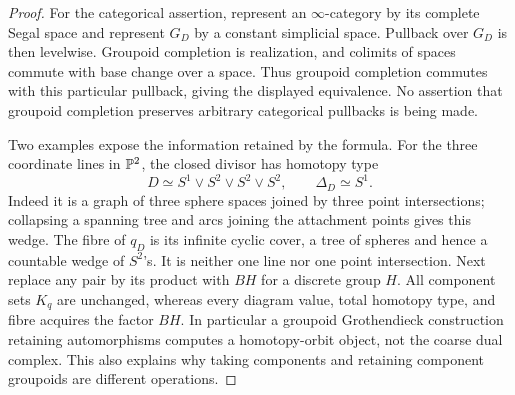 \begin{proof}
For the categorical assertion, represent an $\infty$-category by its complete Segal space and represent $G_D$ by a constant simplicial space. Pullback over $G_D$ is then levelwise. Groupoid completion is realization, and colimits of spaces commute with base change over a space. Thus groupoid completion commutes with this particular pullback, giving the displayed equivalence. No assertion that groupoid completion preserves arbitrary categorical pullbacks is being made.

Two examples expose the information retained by the formula. For the three coordinate lines in $\mathbb P^2$, the closed divisor has homotopy type
\[
 D\simeq S^1\vee S^2\vee S^2\vee S^2,\qquad \Delta_D\simeq S^1.
\]
Indeed it is a graph of three sphere spaces joined by three point intersections; collapsing a spanning tree and arcs joining the attachment points gives this wedge. The fibre of $q_D$ is its infinite cyclic cover, a tree of spheres and hence a countable wedge of $S^2$'s. It is neither one line nor one point intersection. Next replace any pair by its product with $BH$ for a discrete group $H$. All component sets $K_q$ are unchanged, whereas every diagram value, total homotopy type, and fibre acquires the factor $BH$. In particular a groupoid Grothendieck construction retaining automorphisms computes a homotopy-orbit object, not the coarse dual complex. This also explains why taking components and retaining component groupoids are different operations.
\end{proof}

